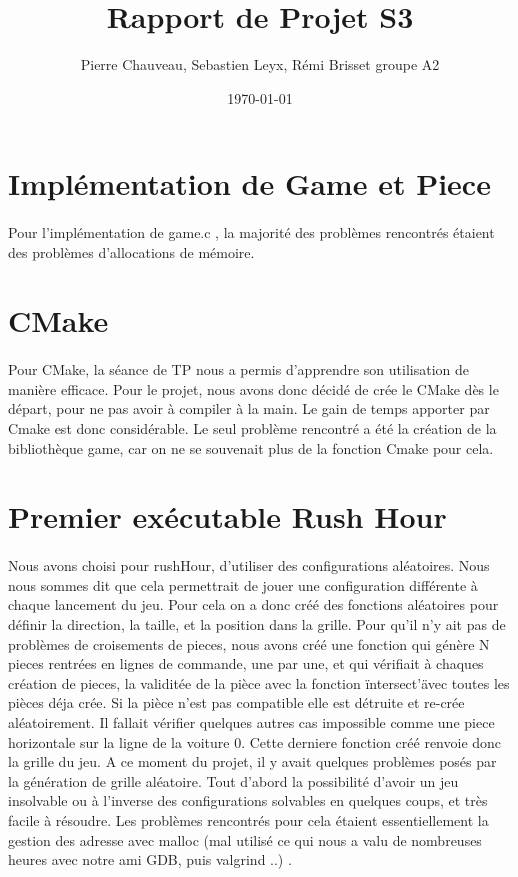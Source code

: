 \documentclass {article}
\title{Rapport de Projet S3}
\date\today
\author{Pierre Chauveau, Sebastien Leyx, Rémi Brisset groupe A2}
\begin{document}
\maketitle
\section{Implémentation de Game et Piece}
\paragraph{}

Pour l'implémentation de \og game.c \fg{}, la majorité des problèmes rencontrés étaient des problèmes d'allocations de mémoire.

\section{CMake}
\paragraph{}
Pour CMake, la séance de TP nous a permis d'apprendre son utilisation de manière efficace. Pour le projet, nous avons donc décidé de crée le CMake dès le départ, pour ne pas avoir à compiler à la main. Le gain de temps apporter par Cmake est donc considérable. Le seul problème rencontré a été la création de la bibliothèque game, car on ne se souvenait plus de la fonction Cmake pour cela. 

\section{Premier exécutable Rush Hour}
\paragraph{}
Nous avons choisi pour rushHour, d'utiliser des configurations aléatoires. Nous nous sommes dit que cela permettrait de jouer une configuration différente à chaque lancement du jeu. Pour cela on a donc créé des fonctions aléatoires pour définir la direction, la taille, et la position dans la grille. Pour qu'il n'y ait pas de problèmes de croisements de pieces, nous avons créé une fonction qui génère N pieces rentrées en lignes de commande, une par une, et qui vérifiait à chaques création de pieces, la validitée de la pièce avec la fonction \"intersect'\" avec toutes les pièces déja crée. Si la pièce n'est pas compatible elle est détruite et re-crée aléatoirement. Il fallait vérifier quelques autres cas impossible comme une piece horizontale sur la ligne de la voiture 0. Cette derniere fonction créé renvoie donc la grille du jeu. A ce moment du projet, il y avait quelques problèmes posés par la génération de grille aléatoire. Tout d'abord la possibilité d'avoir un jeu insolvable ou à l'inverse des configurations solvables en quelques coups, et très facile à résoudre. Les problèmes rencontrés pour cela étaient essentiellement la gestion des adresse avec malloc (mal utilisé ce qui nous a valu de nombreuses heures avec notre ami GDB, puis valgrind ..) .
\smallskip
\end{document}

